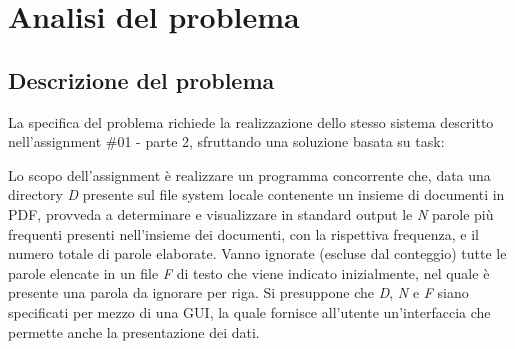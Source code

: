 \section{Analisi del problema}
\subsection{Descrizione del problema}
La specifica del problema richiede la realizzazione dello stesso sistema descritto nell'assignment \#01 - parte 2, sfruttando una soluzione basata su task: \newline

\noindent Lo scopo dell'assignment è realizzare un programma concorrente che, data una directory \textit{D} presente sul file system locale contenente un insieme di documenti in PDF, provveda a determinare e visualizzare in standard output le \textit{N} parole più frequenti presenti nell’insieme dei documenti, con la rispettiva frequenza, e il numero totale di parole elaborate.\newline
Vanno ignorate (escluse dal conteggio) tutte le parole elencate in un file \textit{F} di testo che viene indicato inizialmente, nel quale è presente una parola da ignorare per riga.\newline
Si presuppone che \textit{D}, \textit{N} e \textit{F} siano specificati per mezzo di una GUI, la quale fornisce all'utente un'interfaccia che permette anche la presentazione dei dati.
